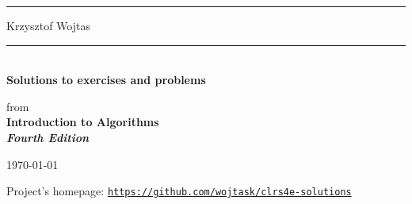 \thispagestyle{empty}
\noindent\hspace*{-\lmarginparwidth}\rule{\lmarginparwidth+\textwidth}{\thickrulethickness}
\noindent\hspace*{-\lmarginparwidth}Krzysztof Wojtas
\vspace*{1.7in}
\par\noindent\rule{\textwidth}{\thinrulethickness}\\[5pt]
{\Large\textbf{Solutions to exercises and problems}}
\vspace*{.5in}
\begin{center}
    from\\[1ex]
    \Large\textbf{Introduction to Algorithms\\
    \textit{Fourth Edition}}
\end{center}
\vspace*{.5in}
\par{}

\vfill

\hfill{\footnotesize\today}

\pagebreak

\hbox{}\vfill
\noindent Project's homepage: \href{https://github.com/wojtask/clrs4e-solutions}{\texttt{https://github.com/wojtask/clrs4e-solutions}}

\pagebreak
